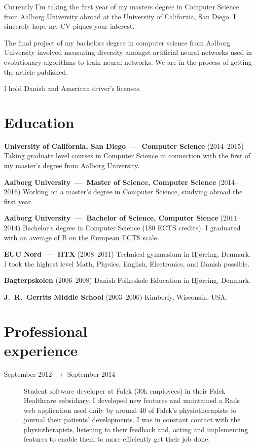 \documentclass[margin,line]{resume}
\begin{document}
\begin{resume}
    Currently I'm taking the first year of my masters degree in Computer Science from Aalborg University abroad at the University of California, San Diego. I sincerely hope my CV piques your interest.

    The final project of my bachelors degree in computer science from Aalborg University involved measuring diversity amongst artificial neural networks used in evolutionary algorithms to train neural networks. We are in the process of getting the article published.
    
    I hold Danish and American driver's licenses.

\section{\mysidestyle{} Education}
    \textbf{University of California, San Diego~---~Computer Science}
    (2014--2015) Taking graduate level courses in Computer Science in connection with the first of my master's degree from Aalborg University.

    \textbf{Aalborg University~---~Master of Science, Computer Science}
    (2014--2016) Working on a master's degree in Computer Science, studying abroad the first year.

    \textbf{Aalborg University~---~Bachelor of Science, Computer Sience}
    (2011--2014) Bachelor's degree in Computer Science (180 ECTS credits). I graduated with an average of B on the European ECTS scale.      

    \textbf{EUC Nord~---~HTX} (2008--2011) Technical gymnasium in Hjørring, Denmark. I took the highest level Math, Physics, English, Electronics, and Danish possible.
    
    \textbf{Bagterpskolen} (2006--2008) Danish Folkeskole Education in Hjørring, Denmark.

    \textbf{J.\ R.\ Gerrits Middle School} (2003--2006) Kimberly, Wisconsin, USA\@.

\section{\mysidestyle{} Professional\\experience}\vspace{1mm}
\begin{description}

  \item[September 2012 $\rightarrow$ September 2014] Student software developer at Falck (30k employees) in their Falck Healthcare subsidiary. I developed new features and maintained a Rails web application used daily by around 40 of Falck's physiotherapists to journal their patients' developments. I was in constant contact with the physiotherapists, listening to their feedback and, acting and implementing features to enable them to more efficiently get their job done.


\end{description}
\end{resume}
\end{document}

